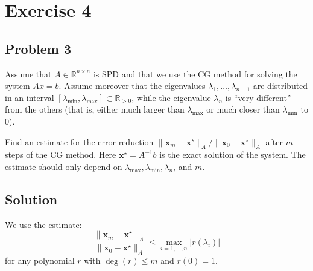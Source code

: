 \section{Exercise 4}

\subsection{Problem 3}
Assume that $A \in \mathbb{R}^{n \times n}$ is SPD and that we use the CG method for solving the system $Ax = b$. Assume moreover that the eigenvalues $\lambda_1, \ldots, \lambda_{n-1}$ are distributed in an interval $[\lambda_{\min}, \lambda_{\max}] \subset \mathbb{R}_{>0}$, while the eigenvalue $\lambda_n$ is “very different” from the others (that is, either much larger than $\lambda_{\max}$ or much closer than $\lambda_{\min}$ to 0).

\medskip

Find an estimate for the error reduction $\| \mathbf{x}_m - \mathbf{x}^\star \|_A / \| \mathbf{x}_0 - \mathbf{x}^\star \|_A$ after $m$ steps of the CG method. Here $\mathbf{x}^\star = A^{-1} b$ is the exact solution of the system. The estimate should only depend on $\lambda_{\max}, \lambda_{\min}, \lambda_n$, and $m$.

\subsection*{Solution}
We use the estimate:
\[
    \frac{\| \mathbf{x}_m - \mathbf{x}^\star \|_A}{\| \mathbf{x}_0 - \mathbf{x}^\star \|_A} \leq \max_{i = 1, \ldots, n} |r(\lambda_i)|
\]
for any polynomial $r$ with $\deg(r) \leq m$ and $r(0) = 1$.

